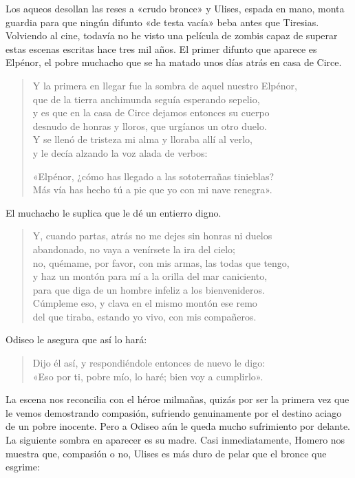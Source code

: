 Los aqueos desollan las reses a «crudo bronce» y Ulises, espada en mano, monta guardia para que ningún difunto «de testa vacía» beba antes que Tiresias. Volviendo al cine, todavía no he visto una película de zombis capaz de superar estas escenas escritas hace tres mil años. El primer difunto que aparece es Elpénor, el pobre muchacho que se ha matado unos días atrás en casa de Circe.

\begin{verse}
Y la primera en llegar fue la sombra de aquel nuestro Elpénor,\\
que de la tierra anchimunda seguía esperando sepelio,\\
y es que en la casa de Circe dejamos entonces su cuerpo\\
desnudo de honras y lloros, que urgíanos un otro duelo.\\
Y se llenó de tristeza mi alma y lloraba allí al verlo,\\
y le decía alzando la voz alada de verbos:

«Elpénor, ¿cómo has llegado a las sototerrañas tinieblas?\\
Más vía has hecho tú a pie que yo con mi nave renegra».
\end{verse}

El muchacho le suplica que le dé un entierro digno.

\begin{verse}
Y, cuando partas, atrás no me dejes sin honras ni duelos\\
abandonado, no vaya a venírsete la ira del cielo;\\
no, quémame, por favor, con mis armas, las todas que tengo,\\
y haz un montón para mí a la orilla del mar caniciento,\\
para que diga de un hombre infeliz a los bienvenideros.\\
Cúmpleme eso, y clava en el mismo montón ese remo\\
del que tiraba, estando yo vivo, con mis compañeros.
\end{verse}

Odiseo le asegura que así lo hará:

\begin{verse}
Dijo él así, y respondiéndole entonces de nuevo le digo:\\
«Eso por ti, pobre mío, lo haré; bien voy a cumplirlo».
\end{verse}

La escena nos reconcilia con el héroe milmañas, quizás por ser la primera vez que le vemos demostrando compasión, sufriendo genuinamente por el destino aciago de un pobre inocente. Pero a Odiseo aún le queda mucho sufrimiento por delante. La siguiente sombra en aparecer es su madre. Casi inmediatamente, Homero nos muestra que, compasión o no, Ulises es más duro de pelar que el bronce que esgrime:

